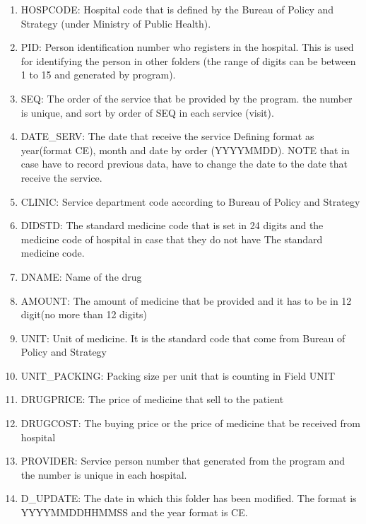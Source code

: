 \begin{enumerate}
  \item HOSPCODE: Hospital code that is defined by the Bureau of Policy and Strategy (under Ministry of Public Health). 
  \item PID: Person identification number who registers in the hospital. This is used for identifying the person in other folders (the range of digits can be between 1 to 15 and generated by program).
  \item SEQ: The order of the service that be provided by the program. the number is unique, and sort by order of SEQ in each service (visit). 
  \item DATE\_SERV: The date that receive the service Defining format as year(format CE), month and date by order (YYYYMMDD). NOTE that in case have to record previous data, have to change the date to the date that receive the service.
  \item CLINIC: Service department code according to Bureau of Policy and Strategy
  \item DIDSTD: The standard medicine code that is set in 24 digits and the medicine code of hospital in case that they do not have The standard medicine code.
  \item DNAME: Name of the drug
  \item AMOUNT: The amount of medicine that be provided and it has to be in 12 digit(no more than 12 digits)
  \item UNIT: Unit of medicine. It is the standard code that come from Bureau of Policy and Strategy  
  \item UNIT\_PACKING: Packing size per unit that is counting in Field UNIT  
  \item DRUGPRICE: The price of medicine that sell to the patient
  \item DRUGCOST: The buying price or the price of medicine that be received from hospital  
  \item PROVIDER: Service person number that generated from the program and the number is unique in each hospital.
  \item D\_UPDATE: The date in which this folder has been modified. The format is YYYYMMDDHHMMSS and the year format is CE.
\end{enumerate}










